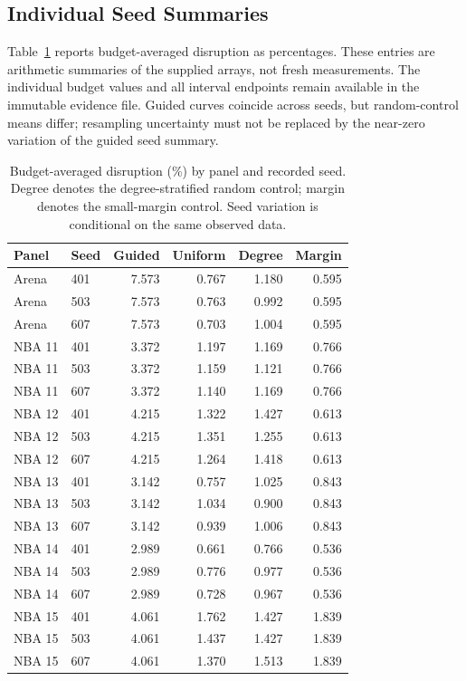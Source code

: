 \documentclass{article}
\begin{document}
\subsection{Individual Seed Summaries}
Table~\ref{tab:seeds} reports budget-averaged disruption as percentages. These entries are arithmetic summaries of the supplied arrays, not fresh measurements. The individual budget values and all interval endpoints remain available in the immutable evidence file. Guided curves coincide across seeds, but random-control means differ; resampling uncertainty must not be replaced by the near-zero variation of the guided seed summary.
\begin{table}[h]
\centering
\caption{Budget-averaged disruption (\%) by panel and recorded seed. Degree denotes the degree-stratified random control; margin denotes the small-margin control. Seed variation is conditional on the same observed data.}
\label{tab:seeds}
\begin{tabular}{llrrrr}
\toprule
Panel & Seed & Guided & Uniform & Degree & Margin\\
\midrule
Arena & 401 & 7.573 & 0.767 & 1.180 & 0.595\\
Arena & 503 & 7.573 & 0.763 & 0.992 & 0.595\\
Arena & 607 & 7.573 & 0.703 & 1.004 & 0.595\\
NBA 11 & 401 & 3.372 & 1.197 & 1.169 & 0.766\\
NBA 11 & 503 & 3.372 & 1.159 & 1.121 & 0.766\\
NBA 11 & 607 & 3.372 & 1.140 & 1.169 & 0.766\\
NBA 12 & 401 & 4.215 & 1.322 & 1.427 & 0.613\\
NBA 12 & 503 & 4.215 & 1.351 & 1.255 & 0.613\\
NBA 12 & 607 & 4.215 & 1.264 & 1.418 & 0.613\\
NBA 13 & 401 & 3.142 & 0.757 & 1.025 & 0.843\\
NBA 13 & 503 & 3.142 & 1.034 & 0.900 & 0.843\\
NBA 13 & 607 & 3.142 & 0.939 & 1.006 & 0.843\\
NBA 14 & 401 & 2.989 & 0.661 & 0.766 & 0.536\\
NBA 14 & 503 & 2.989 & 0.776 & 0.977 & 0.536\\
NBA 14 & 607 & 2.989 & 0.728 & 0.967 & 0.536\\
NBA 15 & 401 & 4.061 & 1.762 & 1.427 & 1.839\\
NBA 15 & 503 & 4.061 & 1.437 & 1.427 & 1.839\\
NBA 15 & 607 & 4.061 & 1.370 & 1.513 & 1.839\\
\bottomrule
\end{tabular}
\end{table}
\end{document}
